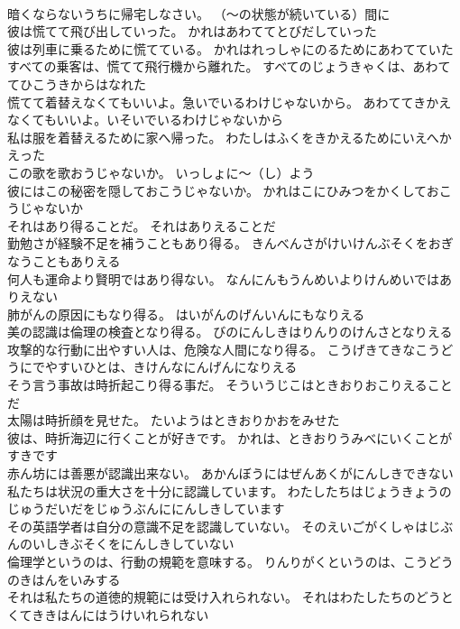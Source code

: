\documentclass[8pt]{extreport}
\begin{document}
\begin{CJK}{UTF8}{min}
\\	暗くならないうちに帰宅しなさい。	（～の状態が続いている）間に
\\	彼は慌てて飛び出していった。	かれはあわててとびだしていった 
\\	彼は列車に乗るために慌てている。	かれはれっしゃにのるためにあわてていた 
\\	すべての乗客は、慌てて飛行機から離れた。	すべてのじょうきゃくは、あわててひこうきからはなれた 
\\	慌てて着替えなくてもいいよ。急いでいるわけじゃないから。	あわててきかえなくてもいいよ。いそいでいるわけじゃないから 
\\	私は服を着替えるために家へ帰った。	わたしはふくをきかえるためにいえへかえった 
\\	この歌を歌おうじゃないか。	いっしょに～（し）よう
\\	彼にはこの秘密を隠しておこうじゃないか。	かれはこにひみつをかくしておこうじゃないか 
\\	それはあり得ることだ。	それはありえることだ 
\\	勤勉さが経験不足を補うこともあり得る。	きんべんさがけいけんぶそくをおぎなうこともありえる 
\\	何人も運命より賢明ではあり得ない。	なんにんもうんめいよりけんめいではありえない 
\\	肺がんの原因にもなり得る。	はいがんのげんいんにもなりえる 
\\	美の認識は倫理の検査となり得る。	びのにんしきはりんりのけんさとなりえる 
\\	攻撃的な行動に出やすい人は、危険な人間になり得る。	こうげきてきなこうどうにでやすいひとは、きけんなにんげんになりえる 
\\	そう言う事故は時折起こり得る事だ。	そういうじこはときおりおこりえることだ 
\\	太陽は時折顔を見せた。	たいようはときおりかおをみせた 
\\	彼は、時折海辺に行くことが好きです。	かれは、ときおりうみべにいくことがすきです 
\\	赤ん坊には善悪が認識出来ない。	あかんぼうにはぜんあくがにんしきできない 
\\	私たちは状況の重大さを十分に認識しています。	わたしたちはじょうきょうのじゅうだいだをじゅうぶんににんしきしています 
\\	その英語学者は自分の意識不足を認識していない。	そのえいごがくしゃはじぶんのいしきぶそくをにんしきしていない 
\\	倫理学というのは、行動の規範を意味する。	りんりがくというのは、こうどうのきはんをいみする 
\\	それは私たちの道徳的規範には受け入れられない。	それはわたしたちのどうとくてききはんにはうけいれられない 

\end{CJK}
\end{document}
